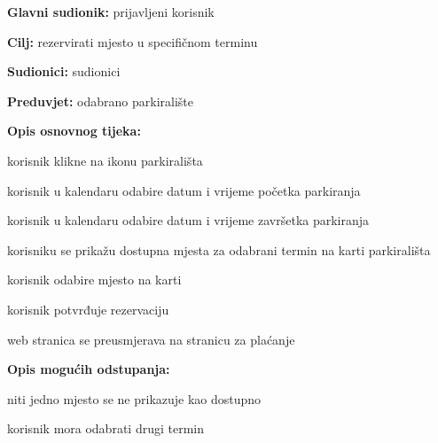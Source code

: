 					\noindent {}
					\begin{packed_item}
						
						\item \textbf{Glavni sudionik: }prijavljeni korisnik
						\item  \textbf{Cilj:} rezervirati mjesto u specifičnom terminu
						\item  \textbf{Sudionici:} sudionici
						\item  \textbf{Preduvjet:} odabrano parkiralište
						\item  \textbf{Opis osnovnog tijeka:}
						
						\item[] \begin{packed_enum}
							
							\item korisnik klikne na ikonu parkirališta
							\item korisnik u kalendaru odabire datum i vrijeme početka parkiranja
							\item korisnik u kalendaru odabire datum i vrijeme završetka parkiranja 
							\item korisniku se prikažu dostupna mjesta za odabrani termin na karti parkirališta
							\item korisnik odabire mjesto na karti
							\item korisnik potvrđuje rezervaciju
							\item web stranica se preusmjerava na stranicu za plaćanje
						\end{packed_enum}
						
						\item  \textbf{Opis mogućih odstupanja:}
						
						\item[] \begin{packed_item}
							
							\item[4.a]niti jedno mjesto se ne prikazuje kao dostupno
							\item[] \begin{packed_enum}
								
								\item korisnik mora odabrati drugi termin
								
								
							\end{packed_enum}
							
							
						\end{packed_item}
					\end{packed_item}
					
